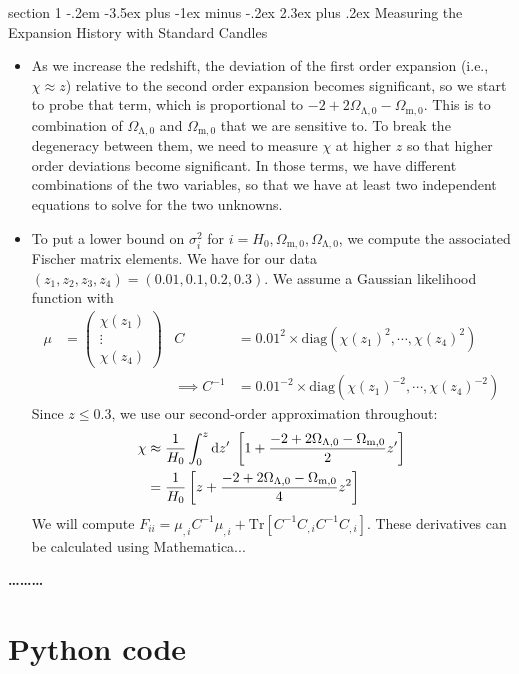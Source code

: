 \documentclass[12pt]{article}
\makeatletter
\newenvironment{problem}{\@startsection
	{section}
	{1}
	{-.2em}
	{-3.5ex plus -1ex minus -.2ex}
	{2.3ex plus .2ex}
	{\pagebreak[3]%
		\large\bf\noindent{Problem }
	}
}
{%
	\begin{center}\large\bf \ldots\ldots\ldots\end{center}}
\newcommand{\Omx}[1]{\ensuremath{\Omega_\mathrm{#1} } }
\makeatother
\begin{document}
\begin{problem}{Measuring the Expansion History with Standard Candles}
\begin{itemize}
			\item As we increase the redshift, the deviation of the first order expansion (i.e., $\chi\approx z$) relative to the second order expansion becomes significant, so we start to probe that term, which is proportional to $-2 + 2 \Omx{\Lambda,0} - \Omx{m,0}$.  This is to combination of $\Omx{\Lambda,0}$ and $\Omx{m,0}$ that we are sensitive to.  To break the degeneracy between them, we need to measure $\chi$ at higher $z$ so that higher order deviations become significant.  In those terms, we have different combinations of the two variables, so that we have at least two independent equations to solve for the two unknowns.
			
			\item To put a lower bound on $\sigma_i^2$ for $i = H_0, \Omx{m,0}, \Omx{\Lambda,0}$, we compute the associated Fischer matrix elements.  We have for our data $(z_1, z_2, z_3, z_4) = (0.01, 0.1, 0.2, 0.3)$.  We assume a Gaussian likelihood function with \begin{align*}
				\mu &= \begin{pmatrix}
					\chi(z_1) \\ \vdots \\ \chi(z_4)
				\end{pmatrix} & C &= 0.01^2 \times  \mathrm{diag}\left(\chi(z_1)^2, \cdots, \chi(z_4)^2\right)
				\\
				&& \implies C^{-1} &= 0.01^{-2} \times  \mathrm{diag}\left(\chi(z_1)^{-2}, \cdots, \chi(z_4)^{-2}\right) 
			\end{align*} Since $z\leq0.3$, we use our second-order approximation throughout: \begin{align*}
				\chi &\approx \frac{1}{H_0} \int_0^z \dif z'\ \left[1 + \frac{-2 + 2 \Omx{\Lambda,0} - \Omx{m,0}}{2} z' \right] 
				\\
				&= \frac{1}{H_0} \left[z + \frac{-2 + 2 \Omx{\Lambda,0} - \Omx{m,0}}{4} z^2 \right] 
			\end{align*} We will compute $F_{ii} = \mu_{,i}C^{-1}\mu_{,i} + \mathrm{Tr}[C^{-1}C_{,i}C^{-1}C_{,i}]$.  These derivatives can be calculated using Mathematica...
			
		\end{itemize}
	\end{problem}


\appendix
\section{Python code}

\end{document}
